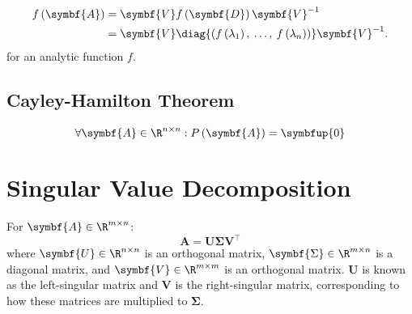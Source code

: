 \documentclass{article}
\begin{document}
\begin{multicols*}{3}
    \begin{align*}
        f\left( \symbf{A} \right) & = \symbf{V} f\left( \symbf{D} \right) \symbf{V}^{-1}                                                               \\
                                  & = \symbf{V} \diag{\left( f\left( \lambda_1 \right),\: \ldots,\: f\left( \lambda_n \right) \right)} \symbf{V}^{-1}.
    \end{align*}
    for an analytic function \(f\).
    \subsection{Cayley-Hamilton Theorem}
        \begin{equation*}
            \forall \symbf{A} \in \R^{n\times n} : P\left( \symbf{A} \right) = \symbfup{0}
        \end{equation*}
    \section{Singular Value Decomposition}
    For \(\symbf{A} \in \R^{m \times n}\):
    \begin{equation*}
        \symbf{A} = \symbf{U} \symbf{\Sigma} \symbf{V}^\top
    \end{equation*}
    where \(\symbf{U} \in \R^{n \times n}\) is an orthogonal matrix, \(\symbf{\Sigma} \in \R^{m \times n}\)
    is a diagonal matrix, and \(\symbf{V} \in  \R^{m \times m}\) is
    an orthogonal matrix.
    \(\symbf{U}\) is known as the left-singular matrix and \(\symbf{V}\) is the right-singular matrix,
    corresponding to how these matrices are multiplied to \(\symbf{\Sigma}\).


\end{multicols*}
\end{document}

